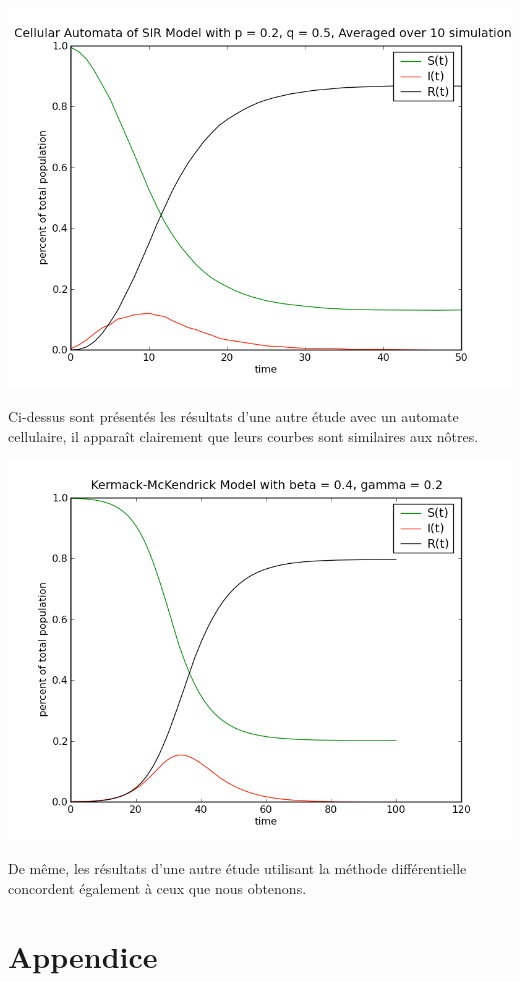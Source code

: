 \documentclass{article}
\begin{document}
\includegraphics[scale=0.5]{../images/automate_cellulaire_comp.png} 

Ci-dessus sont présentés les résultats d'une autre étude avec un automate cellulaire, il apparaît clairement que leurs courbes sont similaires aux nôtres.

\includegraphics[scale=0.5]{../images/differentiel_1.png} 

De même, les résultats d'une autre étude utilisant la méthode différentielle concordent également à ceux que nous obtenons.

\section{Appendice}
\end{document}
